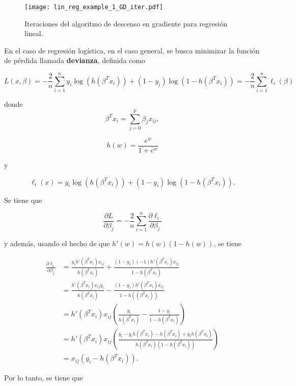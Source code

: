 \begin{figure}[H]
  \centering
  \texttt{[image: lin\_reg\_example\_1\_GD\_iter.pdf]}
  \caption{Iteraciones del algoritmo de descenso en gradiente para regresión lineal.}
  \label{fig:reg_lineal_ejemplo_GD_iter}
\end{figure}


En el caso de regresión logística, en el caso general, se busca minimizar la función de pérdida llamada \textbf{devianza}, definida como

\begin{equation}
  \label{eq:devianza_reg_log}
  L(x, \beta) = - \frac{2}{n} \sum_{i=1}^{n}{y_i \log(h(\beta^T x_i)) + (1-y_i) \log(1-h(\beta^T x_i))} = 
     - \frac{2}{n} \sum_{i=1}^{n}{\ell_i(\beta)}
\end{equation}

donde 
$$
  \beta^T x_i = \sum_{j=0}^{p}{\beta_j x_{ij}},
$$ 

$$
  h(w) = \frac{e^w}{1+e^w}
$$ 

y 

$$
\ell_i(x) = y_i \log(h(\beta^T x_i)) + (1-y_i) \log(1-h(\beta^T x_i)).
$$

Se tiene que 

$$
  \frac{\partial L}{\partial \beta_j} = -\frac{2}{n} \sum_{i = 1}^n { \frac{\partial \ell_i}{\partial \beta_j} }
$$

y además, usando el hecho de que $h'(w) = h(w)(1-h(w))$, se tiene

\begin{equation*}
  \begin{split}
    \frac{\partial \ell_i}{\partial \beta_j} & = 
      \frac{y_i h'(\beta^T x_i) x_{ij} }  {h(\beta^T x_i)} + \frac{(1 - y_i) (-1) h'(\beta^T x_i) x_{ij}} {1 - h(\beta^T x_i)} \\
      & = \frac{h'(\beta^T x_i) x_{ij} y_i}{h(\beta^T x_i)} - \frac{(1 - y_i) h'(\beta^T x_i) x_{ij}}{1 - h((\beta^T x_i))} \\
      & = h'(\beta^T x_i) x_{ij} (\frac{y_i}{h(\beta^T x_i)} - \frac{1-y_i}{1-h(\beta^T x_i)}) \\
      & = h'(\beta^T x_i) x_{ij} \left(\frac{y_i - y_i h(\beta^T x_i) - 
          h(\beta^T x_i) + y_i h(\beta^T x_i)}{h(\beta^T x_i)(1-h(\beta^T x_i))} \right) \\
      & = x_{ij}(y_i - h(\beta^T x_i)).
  \end{split}
\end{equation*}

Por lo tanto, se tiene que 

